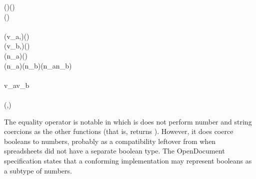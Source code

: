 \begin{hscode}
\>[B]{}\;\;\;(\;){}\<[40]%
\>[40]{}\mathrel{=}\;{}\<[49]%
\>[49]{}(\mathbin{*})\;{}\<[55]%
\>[55]{}\;\;\;\<[E]%
\\[\blanklineskip]%
\>[B]{}\;\;\;(\;)\mathrel{=}{}\<[E]%
\\
\>[B]{}\<[4]%
\>[4]{}\<[E]%
\\
\>[4]{}\<[7]%
\>[7]{}(v_a,{}\<[13]%
\>[13]{}){}\<[20]%
\>[20]{}\mathrel{=}\mathbin{\$}(\;)\;\;\;{}\<[54]%
\>[54]{}\<[E]%
\\
\>[4]{}\<[7]%
\>[7]{}(v_b,{}\<[13]%
\>[13]{}){}\<[20]%
\>[20]{}\mathrel{=}\mathbin{\$}(\;)\;\;\;{}\<[54]%
\>[54]{}\<[E]%
\\[\blanklineskip]%
\>[4]{}\<[7]%
\>[7]{}\;{}\<[14]%
\>[14]{}(\;n_a)\;{}\<[29]%
\>[29]{}(\;){}\<[44]%
\>[44]{}\mathrel{=}\;\<[E]%
\\
\>[4]{}\<[7]%
\>[7]{}\;{}\<[14]%
\>[14]{}(\;n_a)\;{}\<[29]%
\>[29]{}(\;n_b){}\<[44]%
\>[44]{}\mathrel{=}\;(n_a\mathbin{/}n_b){}\<[E]%
\\
\>[4]{}\<[7]%
\>[7]{}\;{}\<[14]%
\>[14]{}\anonymous \;{}\<[29]%
\>[29]{}\anonymous {}\<[44]%
\>[44]{}\mathrel{=}\;\<[E]%
\\[\blanklineskip]%
\>[4]{}\<[7]%
\>[7]{}\mathrel{=}\;\;v_a\;v_b{}\<[E]%
\\
\>[B]{}\<[4]%
\>[4]{}\<[E]%
\\
\>[4]{}\<[7]%
\>[7]{}(,){}\<[E]%
\ColumnHook
\end{hscode}\resethooks

The equality operator is notable in which is does not perform number and
string coercions as the other functions (that is,  returns ).
However, it does coerce booleans to numbers, probably as a compatibility
leftover from when spreadsheets did not have a separate boolean type. The
OpenDocument specification \cite{OASIS2011ODFFormula} states that a conforming
implementation may represent booleans as a subtype of numbers.


